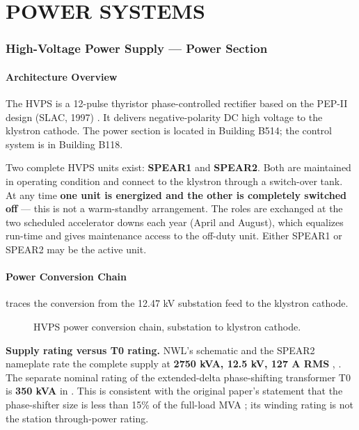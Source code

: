 \FloatBarrier\clearpage
\part{POWER SYSTEMS}


\section{High-Voltage Power Supply --- Power Section}\label{sec:hvps-power}

\subsection{Architecture Overview}

The HVPS is a 12-pulse thyristor phase-controlled rectifier based on the PEP-II design (SLAC, 1997) . It delivers negative-polarity DC high voltage to the klystron cathode. The power section is located in Building B514; the control system is in Building B118.

Two complete HVPS units exist: \textbf{SPEAR1} and \textbf{SPEAR2}. Both are maintained in operating condition and connect to the klystron through a switch-over tank. At any time \textbf{one unit is energized and the other is completely switched off} --- this is not a warm-standby arrangement. The roles are exchanged at the two scheduled accelerator downs each year (April and August), which equalizes run-time and gives maintenance access to the off-duty unit. Either SPEAR1 or SPEAR2 may be the active unit.

\subsection{Power Conversion Chain}

 traces the conversion from the 12.47 kV substation feed to the klystron cathode.

\begin{figure}[tbp]\centering
\begin{fitpicture}\end{fitpicture}
\caption{HVPS power conversion chain, substation to klystron cathode.}\label{fig:hvps-chain}
\end{figure}

\begin{keynote}
\textbf{Supply rating versus T0 rating.} NWL's schematic and the SPEAR2 nameplate rate the complete supply at \textbf{2750 kVA, 12.5 kV, 127 A RMS} , . The separate nominal rating of the extended-delta phase-shifting transformer T0 is \textbf{350 kVA} in . This is consistent with the original paper's statement that the phase-shifter size is less than 15\% of the full-load MVA ; its winding rating is not the station through-power rating.
\end{keynote}

